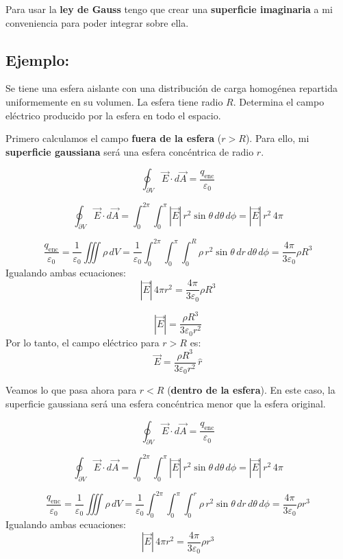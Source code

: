 \documentclass[a4paper,12pt]{article}
\begin{document}
\noindent
Para usar la \textbf{ley de Gauss} tengo que crear una \textbf{superficie imaginaria} a mi conveniencia para poder integrar sobre ella.
\subsection*{Ejemplo:}
\noindent 
Se tiene una esfera aislante con una distribución de carga homogénea repartida uniformemente en su volumen.  
La esfera tiene radio \(R\). Determina el campo eléctrico producido por la esfera en todo el espacio.

\medskip
\noindent
Primero calculamos el campo \textbf{fuera de la esfera} (\(r > R\)).  
Para ello, mi \textbf{superficie gaussiana} será una esfera concéntrica de radio \(r\).

\[
\oint_{\partial V}\vec E\cdot d\vec A = \frac{q_{\text{enc}}}{\varepsilon_0}
\]

\[
\oint_{\partial V}\vec E\cdot d\vec A = \int_0^{2\pi}\int_0^{\pi} |\vec E|\, r^{2}\sin\theta\, d\theta\, d\phi = |\vec E|\,r^{2}\,4\pi
\]

\[
\frac{q_{\text{enc}}}{\varepsilon_0} = \frac{1}{\varepsilon_0}\iiint \rho\, dV = \frac{1}{\varepsilon_0}\int_0^{2\pi}\int_0^{\pi}\int_0^{R} \rho\, r^{2}\sin\theta\, dr\, d\theta\, d\phi = \frac{4\pi}{3\varepsilon_0}\rho R^{3}
\]
Igualando ambas ecuaciones:
\[
|\vec E|\,4\pi r^{2} = \frac{4\pi}{3\varepsilon_0}\rho R^{3}
\]

\[
|\vec E| = \frac{\rho R^{3}}{3\varepsilon_0 r^{2}}
\]
Por lo tanto, el campo eléctrico para \(r > R\) es:
\[
\boxed{\vec E = \frac{\rho R^{3}}{3\varepsilon_0 r^{2}}\,\hat r }
\]

\bigskip
\noindent
Veamos lo que pasa ahora para \(r < R\) (\textbf{dentro de la esfera}).  
En este caso, la superficie gaussiana será una esfera concéntrica menor que la esfera original.

\[
\oint_{\partial V}\vec E\cdot d\vec A = \frac{q_{\text{enc}}}{\varepsilon_0}
\]

\[
\oint_{\partial V}\vec E\cdot d\vec A = \int_0^{2\pi}\int_0^{\pi} |\vec E|\, r^{2}\sin\theta\, d\theta\, d\phi = |\vec E|\,r^{2}\,4\pi
\]

\[
\frac{q_{\text{enc}}}{\varepsilon_0} = \frac{1}{\varepsilon_0}\iiint \rho\, dV = \frac{1}{\varepsilon_0}\int_0^{2\pi}\int_0^{\pi}\int_0^{r} \rho\, r^{2}\sin\theta\, dr\, d\theta\, d\phi = \frac{4\pi}{3\varepsilon_0}\rho r^{3}
\]
Igualando ambas ecuaciones:
\[
|\vec E|\,4\pi r^{2} = \frac{4\pi}{3\varepsilon_0}\rho r^{3}
\]
\end{document}
